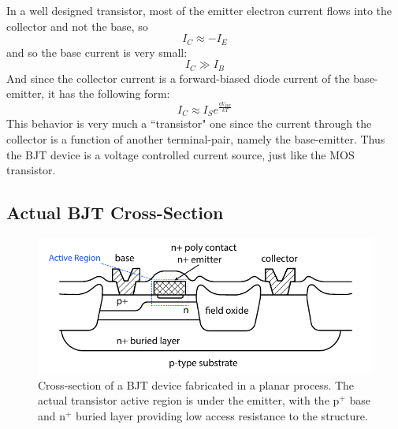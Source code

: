 In a well designed transistor, most of the emitter electron current flows into the collector and not the base, so 
%
\begin{equation}
	{I_C} \approx  - {I_E}
\end{equation}
%
and so the base current is very small:
%
\begin{equation}
	{I_C} \gg {I_B}
\end{equation}
%
And since the collector current is a forward-biased diode current of the base-emitter, it has the following form:
%
\begin{equation}
	{I_C} \approx {I_S}{e^{\frac{{q{V_{BE}}}}{{kT}}}}
\end{equation}
%
This behavior is very much a ``transistor" one since the current through the collector is a function of another terminal-pair, namely the base-emitter.  Thus the BJT device is a voltage controlled current source, just like the MOS transistor.



\subsection{Actual BJT Cross-Section}




\begin{figure}[tb]
\begin{center}
\includegraphics[width=.75\columnwidth]{slide3_bjtcross}
\end{center}
\caption{Cross-section of a BJT device fabricated in a planar process.  The actual transistor active region is under the emitter, with the p$^+$ base and n$^+$ buried layer providing low access resistance to the structure.} \label{fig:slide3_bjtcross}
\end{figure}

